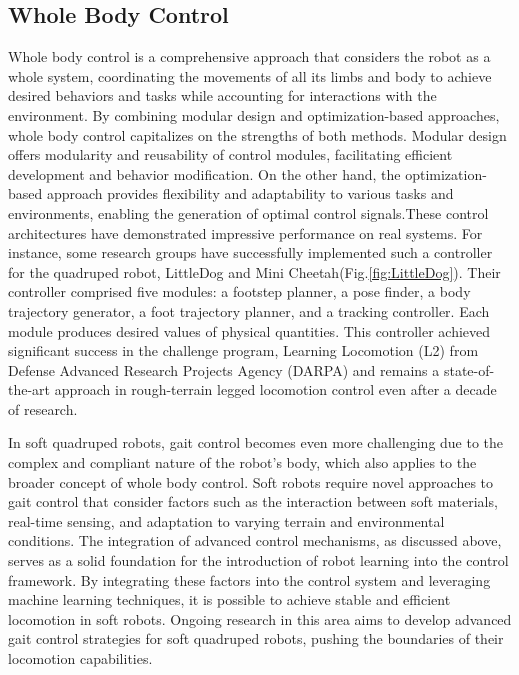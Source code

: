 \subsection{Whole Body Control}
Whole body control is a comprehensive approach that considers the robot as a whole system, coordinating the movements of all its limbs and body to achieve desired behaviors and tasks while accounting for interactions with the environment. By combining modular design and optimization-based approaches, whole body control capitalizes on the strengths of both methods. Modular design offers modularity and reusability of control modules, facilitating efficient development and behavior modification. On the other hand, the optimization-based approach provides flexibility and adaptability to various tasks and environments, enabling the generation of optimal control signals.These control architectures have demonstrated impressive performance on real systems. For instance, some research groups\cite{kalakrishnanFastRobustQuadruped2010,bledtMITCheetahDesign2018} have successfully implemented such a controller for the quadruped robot, LittleDog and Mini Cheetah(Fig.\ref{fig:LittleDog}). Their controller comprised five modules: a footstep planner, a pose finder, a body trajectory generator, a foot trajectory planner, and a tracking controller. Each module produces desired values of physical quantities. This controller achieved significant success in the challenge program\cite{neuhausComprehensiveSummaryInstitute2011}, Learning Locomotion (L2) from Defense Advanced Research Projects Agency (DARPA) and remains a state-of-the-art approach in rough-terrain legged locomotion control even after a decade of research.

In soft quadruped robots, gait control becomes even more challenging due to the complex and compliant nature of the robot's body, which also applies to the broader concept of whole body control. Soft robots require novel approaches to gait control that consider factors such as the interaction between soft materials, real-time sensing, and adaptation to varying terrain and environmental conditions. The integration of advanced control mechanisms, as discussed above, serves as a solid foundation for the introduction of robot learning into the control framework. By integrating these factors into the control system and leveraging machine learning techniques, it is possible to achieve stable and efficient locomotion in soft robots. Ongoing research in this area aims to develop advanced gait control strategies for soft quadruped robots, pushing the boundaries of their locomotion capabilities\cite{gongReviewGaitOptimization2010}.


